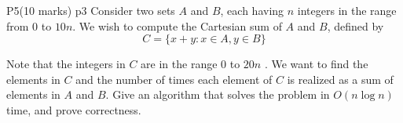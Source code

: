 \documentclass[a4paper, 11pt]{article}
\begin{document}

\begin{problem}{%
		P5\hfill  (10 marks)
	}{p3%
	}
Consider two sets $A$ and $B$, each having $n$ integers in the range from 0 to $10 n$. We wish to compute the Cartesian sum of $A$ and $B$, defined by
$$
C=\{x+y: x \in A, y \in B\}
$$

Note that the integers in $C$ are in the range $0$ to $20n$ . We want to find the elements in $C$ and the number of times each element of $C$ is realized as a sum of elements in $A$ and $B$. Give an algorithm that solves the problem in $O(n \log n)$ time, and prove correctness.

\end{problem}
\solve{
}



\end{document}
